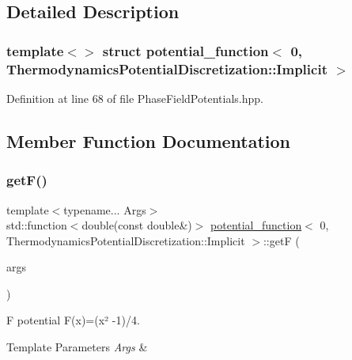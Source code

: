 \subsection{Detailed Description}
\subsubsection*{template$<$$>$\newline
struct potential\+\_\+function$<$ 0, Thermodynamics\+Potential\+Discretization\+::\+Implicit $>$}



Definition at line 68 of file Phase\+Field\+Potentials.\+hpp.



\subsection{Member Function Documentation}
\mbox{\label{structpotential__function_3_010_00_01ThermodynamicsPotentialDiscretization_1_1Implicit_01_4_a18b8e58d6110096f4edb09d4d4df53e7}} 
\subsubsection{\texorpdfstring{get\+F()}{getF()}}
{\footnotesize\ttfamily template$<$typename... Args$>$ \\
std\+::function$<$double(const double\&)$>$ \hyperlink{structpotential__function}{potential\+\_\+function}$<$ 0, Thermodynamics\+Potential\+Discretization\+::\+Implicit $>$\+::getF (\begin{DoxyParamCaption}\item[{Args...}]{args }\end{DoxyParamCaption})\hspace{0.3cm}{\ttfamily [inline]}}



F potential F(x)=(x² -\/1)/4. 


\begin{DoxyTemplParams}{Template Parameters}
{\em Args} & \\
\hline
\end{DoxyTemplParams}

